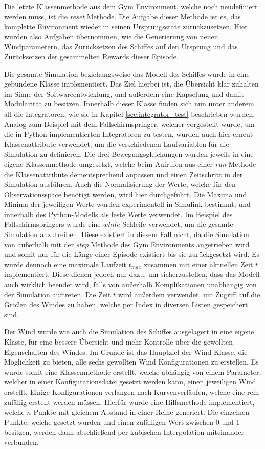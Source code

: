 \documentclass[]{iat}
\begin{document}
Die letzte Klassenmethode aus dem Gym Environment, welche noch neudefiniert werden muss, ist die \textit{reset} Methode. Die Aufgabe dieser Methode ist es, das komplette Environment wieder in seinen Ursprungsstate zurückzusetzen. Hier wurden also Aufgaben übernommen, wie die Generierung von neuen Windparametern, das Zurücksetzen des Schiffes auf den Ursprung und das Zurücksetzen der gesammelten Rewards dieser Episode.

Die gesamte Simulation beziehungsweise das Modell des Schiffes wurde in eine gebundene Klasse implementiert. Das Ziel hierbei ist, die Übersicht klar zuhalten im Sinne der Softwareentwicklung, und außerdem eine Kapselung und damit Modularität zu besitzen. Innerhalb dieser Klasse finden sich nun unter anderem all die Integratoren, wie sie in Kapitel \ref{sec:integrator_test} beschrieben wurden. Analog zum Beispiel mit dem Fallschirmspringer, welcher vorgestellt wurde, um die in Python implementierten Integratoren zu testen, wurden auch hier erneut Klassenattribute verwendet, um die verschiedenen Laufvariablen für die Simulation zu definieren. Die drei Bewegungsgleichungen wurden jeweils in eine eigene Klassenmethode umgesetzt, welche beim Aufrufen aus einer \textit{run} Methode die Klassenattribute dementsprechend anpassen und einen Zeitschritt in der Simulation ausführen. Auch die Normalisierung der Werte, welche für den Observationsspace benötigt werden, wird hier durchgeführt. Die Maxima und Minima der jeweiligen Werte wurden experimentell in Simulink bestimmt, und innerhalb des Python-Modells als feste Werte verwendet. Im Beispiel des Fallschirmspringers wurde eine $while$-Schleife verwendet, um die gesamte Simulation anzutreiben. Diese existiert in diesem Fall nicht, da die Simulation von außerhalb mit der \textit{step} Methode des Gym Environments angetrieben wird und somit nur für die Länge einer Episode existiert bis sie zurückgesetzt wird. Es wurde dennoch eine maximale Laufzeit $t_{max}$ zusammen mit einer aktuellen Zeit $t$ implementiert. Diese dienen jedoch nur dazu, um sicherzustellen, dass das Modell auch wirklich beendet wird, falls von außerhalb Komplikationen unabhängig von der Simulation auftreten. Die Zeit $t$ wird außerdem verwendet, um Zugriff auf die Größen des Windes zu haben, welche per Index in diversen Listen gespeichert sind.

Der Wind wurde wie auch die Simulation des Schiffes ausgelagert in eine eigene Klasse, für eine bessere Übersicht und mehr Kontrolle über die gewollten Eigenschaften des Windes. Im Grunde ist das Hauptziel der Wind-Klasse, die Möglichkeit zu bieten, alle sechs gewollten Wind Konfigurationen zu erstellen. Es wurde somit eine Klassenmethode erstellt, welche abhängig von einem Parameter, welcher in einer Konfigurationsdatei gesetzt werden kann, einen jeweiligen Wind erstellt. Einige Konfigurationen verlangen nach Kurvenverläufen, welche eine rein zufällig erstellt werden müssen. Hierfür wurde eine Hilfsmethode implementiert, welche $n$ Punkte mit gleichem Abstand in einer Reihe generiert. Die einzelnen Punkte, welche gesetzt wurden und einen zufälligen Wert zwischen 0 und 1 besitzen, werden dann abschließend per kubischen Interpolation miteinander verbunden.
\end{document}
